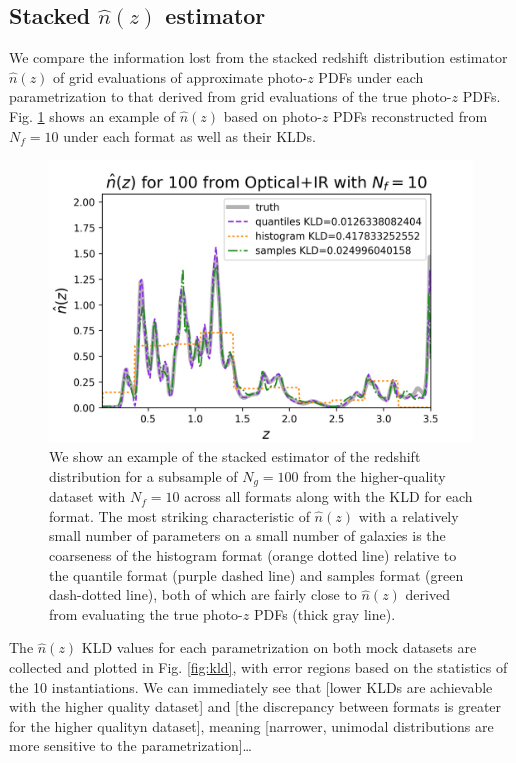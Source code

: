 \documentclass[\docopts]{\docclass}
\newcommand{\pz}{photo-$z$ PDF}
\begin{document}
\subsection{Stacked $\hat{n}(z)$ estimator}
\label{sec:stacked_results}

We compare the information lost from the stacked redshift distribution
estimator $\hat{n}(z)$ of grid evaluations of approximate \pz s under each
parametrization to that derived from grid evaluations of the true \pz s.  Fig.
\ref{fig:stacked} shows an example of $\hat{n}(z)$ based on \pz s reconstructed
from $N_{f}=10$ under each format as well as their KLDs.

\begin{figure}
  \includegraphics[width=0.9\columnwidth]{figures/euclid_stacked.png}
  \caption{We show an example of the stacked estimator of the redshift
distribution for a subsample of $N_{g}=100$ from the higher-quality dataset
with $N_{f}=10$ across all formats along with the KLD for each format.  The
most striking characteristic of $\hat{n}(z)$ with a relatively small number of
parameters on a small number of galaxies is the coarseness of the histogram
format (orange dotted line) relative to the quantile format (purple dashed
line) and samples format (green dash-dotted line), both of which are fairly
close to $\hat{n}(z)$ derived from evaluating the true \pz s (thick gray line).
  \label{fig:stacked}}
\end{figure}

The $\hat{n}(z)$ KLD values for each parametrization on both mock datasets are
collected and plotted in Fig. \ref{fig:kld}, with error regions based on the
statistics of the 10 instantiations.  We can immediately see that [lower KLDs
are achievable with the higher quality dataset] and [the discrepancy between
formats is greater for the higher qualityn dataset], meaning [narrower,
unimodal distributions are more sensitive to the parametrization]\dots
\end{document}
